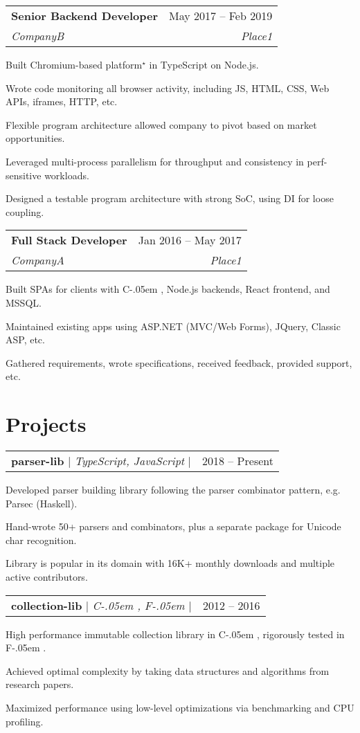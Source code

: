 \documentclass[a4paper,11pt]{article}
\makeatletter
\DeclareRobustCommand*{\https}{\hyper@normalise\https@}
\def\https@#1{\underline{\lowercase{\hyper@linkurl{\Hurl{#1}}{https://#1}}}}
\newcommand{\sharplang}[1]{%
    {\settoheight{\dimen0}{#1}#1\kern-.05em \resizebox{!}{\dimen0}{\raisebox{\depth}{\#}}}%
}
\newcommand{\placeblock}[4]{%
    \vspace{-2pt}\item%
    \begin{tabular*}{0.97\textwidth}[t]{l@{\extracolsep{\fill}}r}%
        \textbf{#1} & #2 \\%
        \textit{\small#3} & \textit{\small #4} \\%
    \end{tabular*}\vspace{-7pt}%
}%
\newenvironment*{place}[4]{%
    \placeblock{#1}{#2}{#3}{#4}
    \begin{itemList}
}{%
    \end{itemList}
}%
\newenvironment*{project}[2]{%
    \item%
	\begin{tabular*}{0.97\textwidth}{l@{\extracolsep{\fill}}r}%
		\small#1 & #2 \\%
	\end{tabular*}\vspace{-7pt}%
    \begin{itemList}%
    }{%
    \end{itemList}%
}
\newcommand{\mywebsite}{career.gregros.dev}
\newcommand{\eternitech}{Eternitech}
\newcommand{\reflectiz}{Reflectiz}
\newcommand{\parjs}{Parjs}
\newcommand{\imms}{Imms}
\newcommand{\ramatgan}{Ramat Gan, Israel}
\renewcommand{\mywebsite}{career.my-site.dev}
\renewcommand{\eternitech}{CompanyA}
\renewcommand{\reflectiz}{CompanyB}
\renewcommand{\parjs}{parser-lib}
\renewcommand{\imms}{collection-lib}
\renewcommand{\ramatgan}{Place1}
\newenvironment{jobReflectizDev}{%
    \begin{place}
        {Senior Backend Developer}{May 2017 -- Feb 2019}
        {\reflectiz}{\ramatgan}
}{%
    \end{place}
}
\newenvironment{jobEternitech}{%
    \begin{place}{Full Stack Developer}{Jan 2016 -- May 2017}
        {\eternitech}{\ramatgan}%
}{%
    \end{place}
}
\makeatother
\begin{document}
\begin{sectionList}
    \begin{jobReflectizDev}
        \item Built Chromium-based platform$^\star$ in TypeScript on Node.js.
        \item Wrote code monitoring all browser activity, including JS, HTML, CSS, Web APIs, iframes, HTTP, etc.
        \item Flexible program architecture allowed company to pivot based on market opportunities.
        \item Leveraged multi-process parallelism for throughput and consistency in perf-sensitive workloads.
        \item Designed a testable program architecture with strong SoC, using DI for loose coupling.
    \end{jobReflectizDev}
    \begin{jobEternitech}
        \item Built SPAs for clients with \sharplang{C}, Node.js backends, React frontend, and MSSQL.\@
        \item Maintained existing apps using ASP.NET (MVC/Web Forms), JQuery, Classic ASP, etc.
        \item Gathered requirements, wrote specifications, received feedback, provided support, etc.
    \end{jobEternitech}
\end{sectionList}%


\section{Projects}
\begin{sectionList}%
    \begin{project}{\textbf{\parjs} $|$ \emph{TypeScript, JavaScript} $|$ \https{\mywebsite/parjs}}{2018 -- Present}
        \item Developed parser building library following the parser combinator pattern, e.g. Parsec (Haskell).
        \item Hand-wrote 50+ parsers and combinators, plus a separate package for Unicode char recognition.
        \item Library is popular in its domain with 16K+ monthly downloads and multiple active contributors.
    \end{project}
    \begin{project}{\textbf{\imms} $|$ \emph{\sharplang{C}, \sharplang{F}} $|$ \https{\mywebsite/imms}}{2012 -- 2016}
        \item High performance immutable collection library in \sharplang{C}, rigorously tested in \sharplang{F}.
        \item Achieved optimal complexity by taking data structures and algorithms from research papers.
        \item Maximized performance using low-level optimizations via benchmarking and CPU profiling.
    \end{project}
\end{sectionList}%
\end{document}
